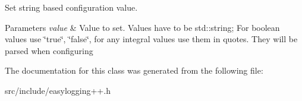 Set string based configuration value. 


\begin{DoxyParams}{Parameters}
{\em value} & Value to set. Values have to be std\+::string; For boolean values use \char`\"{}true\char`\"{}, \char`\"{}false\char`\"{}, for any integral values use them in quotes. They will be parsed when configuring \\
\hline
\end{DoxyParams}


The documentation for this class was generated from the following file\+:\begin{DoxyCompactItemize}
\item 
src/include/easylogging++.\+h\end{DoxyCompactItemize}
